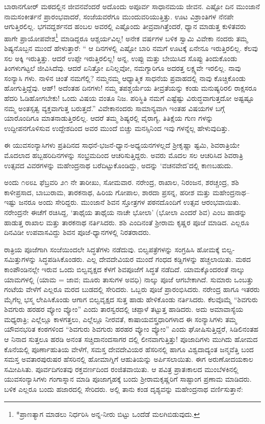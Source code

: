 ಬಾರಾನಗೋರ್ ಮಠದಲ್ಲಿನ ಜೀವನವೆಂದರೆ ಅದೊಂದು ಅಪೂರ್ವ ಸಾಧಾನಮಯ ಜೀವನ. ಎಷ್ಟೋ ದಿನ ಮುಂಜಾನೆ ನಾಮಸಂಕೀರ್ತನೆ ಪ್ರಾರಂಭವಾದರೆ, ಸಂಜೆಯವರೆಗೂ ಮುಂದುವರಿಯುತ್ತಿತ್ತು. ಊಟ ವಿಶ್ರಾಂತಿಗಳ ನೆನಪೇ ಆಗುತ್ತಿರಲಿಲ್ಲ. ಭಗವದ್ದರ್ಶನದ ಹಂಬಲ ಅವರಲ್ಲಿ ಎಷ್ಟೊಂದು ತೀವ್ರವಾಗಿತ್ತೆಂದರೆ, ಧ್ಯಾನ ಮಾಡುತ್ತ ಕುಳಿತವರು ಹಾಗೇ ಪ್ರಾಯೋಪವೇಶ\footnote{*ಪ್ರಾಣತ್ಯಾಗ ಮಾಡಲು ನಿರ್ಧರಿಸಿ ಅನ್ನ-ನೀರು ಬಿಟ್ಟು ಒಂದೆಡೆ ಮಲಗಿಬಿಡುವುದು.} ಮಾಡಿದ್ದರೂ ಆಶ್ಚರ್ಯವಿಲ್ಲ! ಅನೇಕ ವರ್ಷಗಳ ಬಳಿಕ ಸ್ವಾಮಿ ವಿವೇಕಾ ನಂದರು ತಮ್ಮ ಶಿಷ್ಯನೊಬ್ಬನ ಮುಂದೆ ಹೇಳುತ್ತಾರೆ: “ ಆ ದಿನಗಳಲ್ಲಿ ಎಷ್ಟೋ ಬಾರಿ ನಮಗೆ ಊಟಕ್ಕೆ ಏನೇನೂ ಇರುತ್ತಿರಲಿಲ್ಲ. ಕೆಲವು ಸಲ ಅಕ್ಕಿ ಇರುತ್ತಿತ್ತು. ಆದರೆ ಉಪ್ಪೇ ಇರುತ್ತಿರಲಿಲ್ಲ! ಅನ್ನ, ಉಪ್ಪು ಮತ್ತು ಬೇಯಿಸಿದ ಸೊಪ್ಪು ತಿಂದುಕೊಂಡು ತಿಂಗಳುಗಟ್ಟಲೆ ಜೀವಿಸಿದೆವು. ಆದರೆ ಏನಿತ್ತೋ ಏನಿಲ್ಲವೋ, ನಮಗ್ಯಾರಿಗೂ ಅದರತ್ತ ಲಕ್ಷ್ಯವೇ ಇರಲಿಲ್ಲ. ನಾವು ಸಂನ್ಯಾಸಿ ಗಳು. ನಾಳಿನ ಚಿಂತೆ ನಮಗೆಲ್ಲಿ? ನಮ್ಮನಮ್ಮ ಆಧ್ಯಾತ್ಮಿಕ ಸಾಧನೆಯ ಪ್ರವಾಹದಲ್ಲಿ ನಾವು ಕೊಚ್ಚಿಕೊಂಡು ಹೋಗುತ್ತಿದ್ದೆವು. ಆಹ್! ಅದೆಂತಹ ದಿನಗಳು! ನಮ್ಮ ತಪಶ್ಚರ್ಯೆಯ ತೀವ್ರತೆಯನ್ನು ಕಂಡು ಮನುಷ್ಯರಿರಲಿ ರಾಕ್ಷಸರೂ ಹೆದರಿ ಓಡಿಹೋಗಬೇಕು! ಒಂದು ವಿಷಯ ವಂತೂ ನಿಜ. ಪರಿಸ್ಥಿತಿ ನಮಗೆ ಎಷ್ಟೆಷ್ಟು ವಿರುದ್ಧವಾಗುತ್ತದೋ ಅಷ್ಟಷ್ಟೂ ನಮ್ಮ ಅಂತಸ್ಸತ್ವ ವ್ಯಕ್ತವಾಗುತ್ತ ಬರುತ್ತದೆ.” ವಿವೇಕಾನಂದರು ಸಾಮಾನ್ಯವಾಗಿ ಇಂತಹ ವಿಷಯಗಳ ಬಗ್ಗೆ ಯಾರೊಂದಿಗೂ ಮಾತನಾಡುತ್ತಿರಲಿಲ್ಲ. ಆದರೆ ತಮ್ಮ ಶಿಷ್ಯರಲ್ಲಿ ವೈರಾಗ್ಯ, ತಿತಿಕ್ಷೆಯ ಗುಣ ಗಳನ್ನು ಉದ್ದೀಪನಗೊಳಿಸುವ ಉದ್ದೇಶದಿಂದ ಅವರ ಮುಂದೆ ಬಿಚ್ಚು ಮನಸ್ಸಿನಿಂದ ಇವು ಗಳನ್ನೆಲ್ಲ ಹೇಳುವುದಿತ್ತು.

ಈ ಯುವಸಂನ್ಯಾಸಿಗಳು ಪ್ರತಿದಿನದ ಸಾಧನೆ-ಭಜನೆ-ಧ್ಯಾನ-ಅಧ್ಯಯನಗಳಲ್ಲದೆ ಶ್ರೀಕೃಷ್ಣಾ ಷ್ಟಮಿ, ಶಿವರಾತ್ರಿಯೇ ಮೊದಲಾದ ಹಬ್ಬಹರಿದಿನಗಳನ್ನು ಸಂಭ್ರಮದಿಂದ ಆಚರಿಸುತ್ತಿದ್ದರು. ಅವರು ಮೊದಲ ಸಲ ಆಚರಿಸಿದ ಶಿವರಾತ್ರಿ ಉತ್ಸವದ ವಿವರಗಳನ್ನು ಮಹೇಂದ್ರನಾಥ ಬರೆದಿಟ್ಟುಕೊಂಡಿದ್ದು, ಅದನ್ನು ‘ವಚನವೇದ’ದಲ್ಲಿ ಕಾಣಬಹುದು.

ಅಂದು ೧೮೮೭ ಫೆಬ್ರವರಿ ೨೧ ನೇ ತಾರೀಖು, ಸೋಮವಾರ. ನರೇಂದ್ರ, ರಾಖಾಲ, ನಿರಂಜನ, ಶರಚ್ಚಂದ್ರ, ಶಶಿ ಕಾಳೀಪ್ರಸಾದ, ಬಾಬುರಾಮ, ತಾರಕನಾಥ, ಹಿರಿಯ ಗೋಪಾಲ, ಶಾರದಾ ಪ್ರಸನ್ನ, ಹರೀಶ ಮತ್ತು ಮಹೇಂದ್ರನಾಥ–ಇಷ್ಟು ಜನರೂ ಅಂದು ಸೇರಿದ್ದರು. ಮುಂಜಾನೆ ಶಿವನ ಸ್ತೋತ್ರಗಳ ಪಠನದೊಂದಿಗೆ ಉತ್ಸವ ಆರಂಭವಾಯಿತು. ನರೇಂದ್ರನೇ ಈಚೆಗೆ ರಚಿಸಿದ್ದ, ‘ತಾಥೈಯ ತಾಥೈಯ ನಾಚೇ ಭೋಲಾ’ (ಭೋಲಾ ಎಂದರೆ ಶಿವ) ಎಂಬ ಹಾಡನ್ನು ಹಾಡುತ್ತ ರಾಖಾಲ ಮತ್ತು ತಾರಕನಾಥ ನರ್ತಿಸಿದರು. ಶಶಿ ಎಂದಿನಂತೆ ಶ್ರೀರಾಮ ಕೃಷ್ಣರ ಪೂಜೆ ಮಾಡಿದ. ಎಲ್ಲರೂ ದಿನವಿಡೀ ಉಪವಾಸವಿದ್ದು ಶಿವನ ಪೂಜೆ-ಧ್ಯಾನಗಳಲ್ಲಿ ನಿರತರಾದರು.

ರಾತ್ರಿಯ ಪೂಜೆಗಾಗಿ ಸಂಜೆಯಿಂದಲೇ ಸಿದ್ಧತೆಗಳು ನಡೆದುವು. ಬಿಲ್ವಪತ್ರೆಗಳನ್ನು ಸಂಗ್ರಹಿಸಿ ಹೋಮಕ್ಕೆ ಬಿಲ್ವ-ಸಮಿತ್ತುಗಳನ್ನು ಸಿದ್ಧಪಡಿಸಿಕೊಂಡರು. ಎಲ್ಲ ದೇವದೇವಿಯರ ಮುಂದೆ ಗಂಧದ ಕಡ್ಡಿಗಳನ್ನು ಹಚ್ಚಲಾಯಿತು. ಮಠದ ಕಾಂಪೌಂಡಿನಲ್ಲೇ ಇರುವ ಒಂದು ಬಿಲ್ವವೃಕ್ಷದ ಕೆಳಗೆ ಶಿವಪೂಜೆಗೆ ಸಿದ್ಧತೆ ನಡೆದಿದೆ. ಯಾಮಕ್ಕೊಂದರಂತೆ ನಾಲ್ಕು ಯಾಮಗಳಲ್ಲಿ (ಯಾಮ = ಜಾವ; ಮೂರು ತಾಸುಗಳ ಅವಧಿ) ನಾಲ್ಕು ಪೂಜೆ ಆಗಬೇಕಾಗಿದೆ. ಸುಮಾರು ಒಂಬತ್ತು ಗಂಟೆಯ ವೇಳೆಗೆ ಎಲ್ಲರೂ ಮರದ ಬುಡದಲ್ಲಿ ಸೇರಿದರು. ಒಬ್ಬರು ಪೂಜೆ ಪ್ರಾರಂಭಿಸಿದರು. ನರೇಂದ್ರ ಹಾಗೂ ಇತರರು ಮೈಗೆಲ್ಲ ಭಸ್ಮ ಲೇಪಿಸಿಕೊಂಡು ಆಗಾಗ ಬಿಲ್ವವೃಕ್ಷದ ಸುತ್ತ ಹಾಡು ಹೇಳಿಕೊಂಡು ನರ್ತಿಸಿದರು. ಕೆಲವೊಮ್ಮೆ “ಶಿವಗುರು ಶಿವಗುರು ಹರಹರ ವ್ಯೋಂ ವ್ಯೋಂ” ಎಂದು ತಾರಸ್ವರದಲ್ಲಿ ಚಪ್ಪಾಳೆ ತಟ್ಟುತ್ತ ಹಾಡಿದರು. ಅದು ಅಮಾವಾಸ್ಯೆಯ ಮಧ್ಯರಾತ್ರಿ; ಎಲ್ಲೆಲ್ಲೂ ಕಾಳಗತ್ತಲು, ಎಲ್ಲೆಲ್ಲೂ ನೀರವತೆ, ಕಾಷಾಯವಸ್ತ್ರಧಾರಿಗಳಾದ ಈ ಸಂನ್ಯಾಸಿಗಳು ತಮ್ಮ ಯೌವನಭರಿತ ಕಂಠಗಳಿಂದ “ಶಿವಗುರು ಶಿವಗುರು ಹರಹರ ವ್ಯೋಂ ವ್ಯೋಂ” ಎಂದು ಘೋಷಿಸುತ್ತಿದ್ದರೆ, ಸಿಡಿಲಿನಂತಹ ಆ ನಿನಾದ ಸುತ್ತಲೂ ಹರಡಿ ಅನಂತ ಸಚ್ಚಿದಾನಂದಸಾಗರ ದಲ್ಲಿ ಲೀನವಾಗುತ್ತಿತ್ತು! ಪೂಜಾದಿಗಳು ಮುಗಿದು ಹೋಮದ ಕೊನೆಯಲ್ಲಿ ಪೂರ್ಣಾಹುತಿಯ ವೇಳೆಗೆ, ಸಮಸ್ತ ದೇವದೇವಿಯರ ಹೆಸರಿನಲ್ಲಿ ಹಾಗೂ ವಿಶ್ವದಾದ್ಯಂತ ಜನ್ಮವೆತ್ತಿ ಬಂದ ಸಮಸ್ತ ಅವತಾರಪುರುಷರ ಹೆಸರಿನಲ್ಲಿ ಹೋಮಾಗ್ನಿಗೆ ಆಹುತಿಯನ್ನು ಅರ್ಪಿಸಲಾಯಿತು. ಈಗ ಅರುಣೋದಯಕಾಲ ಸಮೀಪಿಸಿತು. ಪೂರ್ವದಿಗಂತವು ರಕ್ತವರ್ಣದಿಂದ ರಂಜಿತವಾಯಿತು. ಆ ಪವಿತ್ರ ಪ್ರಾತಃಕಾಲದ ಮುಂಬೆಳಕಿನಲ್ಲಿ ಯುವಸಂನ್ಯಾಸಿಗಳು ಗಂಗಾಸ್ನಾನ ಮಾಡಿ ಪೂಜಾಗೃಹಕ್ಕೆ ಬಂದು ಶ್ರೀರಾಮಕೃಷ್ಣರಿಗೆ ಸಾಷ್ಟಾಂಗ ಪ್ರಣಾಮ ಮಾಡಿದರು. ಬಳಿಕ ಎಲ್ಲರೂ ಬಂದು ಹಜಾರದಲ್ಲಿ ಸೇರಿದರು. ಅಲ್ಲಿ ತಾನು ಕಂಡ ದೃಶ್ಯವನ್ನು ಮಹೇಂದ್ರನಾಥ ವರ್ಣಿಸುತ್ತಾನೆ:

